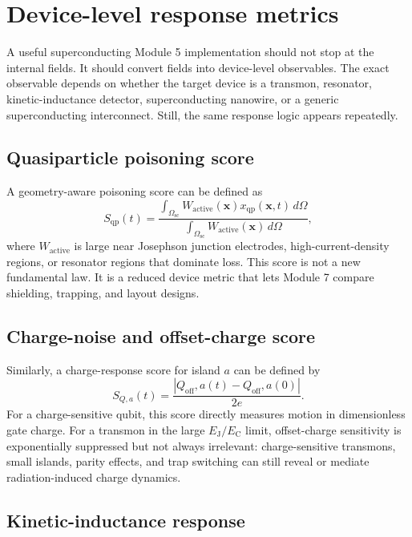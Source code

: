 \documentclass[11pt]{article}
\newcommand{\Om}{\Omega}
\newcommand{\Osc}{\Omega_{\mathrm{sc}}}
\newcommand{\x}{\bm{x}}
\newcommand{\xqp}{x_{\mathrm{qp}}}
\newcommand{\EJ}{E_{\mathrm{J}}}
\newcommand{\EC}{E_{\mathrm{C}}}
\newcommand{\Qoff}{Q_{\mathrm{off}}}
\begin{document}
\section{Device-level response metrics}

A useful superconducting Module 5 implementation should not stop at the internal fields. It should convert fields into device-level observables. The exact observable depends on whether the target device is a transmon, resonator, kinetic-inductance detector, superconducting nanowire, or a generic superconducting interconnect. Still, the same response logic appears repeatedly.

\subsection{Quasiparticle poisoning score}

A geometry-aware poisoning score can be defined as
\begin{equation}
S_{\mathrm{qp}}(t)=\frac{\int_{\Osc} W_{\mathrm{active}}(\x)\xqp(\x,t)\,d\Om}{\int_{\Osc} W_{\mathrm{active}}(\x)\,d\Om},
\end{equation}
where \(W_{\mathrm{active}}\) is large near Josephson junction electrodes, high-current-density regions, or resonator regions that dominate loss. This score is not a new fundamental law. It is a reduced device metric that lets Module 7 compare shielding, trapping, and layout designs.

\subsection{Charge-noise and offset-charge score}

Similarly, a charge-response score for island \(a\) can be defined by
\begin{equation}
S_{Q,a}(t)=\frac{|\Qoff,a(t)-\Qoff,a(0)|}{2e}.
\end{equation}
For a charge-sensitive qubit, this score directly measures motion in dimensionless gate charge. For a transmon in the large \(\EJ/\EC\) limit, offset-charge sensitivity is exponentially suppressed but not always irrelevant: charge-sensitive transmons, small islands, parity effects, and trap switching can still reveal or mediate radiation-induced charge dynamics.

\subsection{Kinetic-inductance response}
\end{document}
